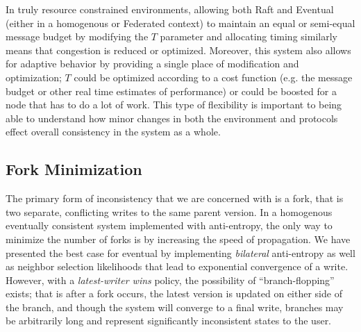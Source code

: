 \documentclass[10pt,conference,letterpaper]{IEEEtran}
\newcommand{\todo}[1]{{\textcolor{red}{#1}}}
\newcommand{\pjk}[1]{[\todo{PJK: #1}]}
\newcommand{\note}[1]{\textcolor{blue}{[#1]}}
\begin{document}
In truly resource constrained environments, allowing both Raft and Eventual (either in a homogenous or Federated context) to maintain an equal or semi-equal message budget by modifying the $T$ parameter and allocating timing similarly means that congestion is reduced or optimized. Moreover, this system also allows for adaptive behavior by providing a single place of modification and optimization; $T$ could be optimized according to a cost function (e.g. the message budget or other real time estimates of performance) or could be boosted for a node that has to do a lot of work. This type of flexibility is important to being able to understand how minor changes in both the environment and protocols effect overall consistency in the system as a whole.



\subsection{Fork Minimization}

The primary form of inconsistency that we are concerned with is a fork, that is two separate, conflicting writes to the same parent version. In a homogenous eventually consistent system implemented with anti-entropy, the only way to minimize the number of forks is by increasing the speed of propagation. We have presented the best case for eventual by implementing \textit{bilateral} anti-entropy as well as neighbor selection likelihoods that lead to exponential convergence of a write. However, with a \textit{latest-writer wins} policy, the possibility of ``branch-flopping'' exists; that is after a fork occurs, the latest version is updated on either side of the branch, and though the system will converge to a final write, branches may be arbitrarily long and represent significantly inconsistent states to the user.
\end{document}

